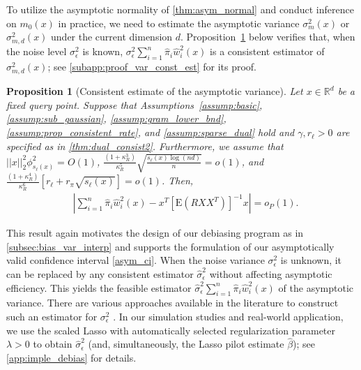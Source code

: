 \documentclass[ejsv2,noshowframe]{imsart}
\theoremstyle{plain}
\newtheorem{proposition}[theorem]{Proposition}
\theoremstyle{definition}
\theoremstyle{remark}
\newcommand{\norm}[1]{\left|\left| #1 \right|\right|}
\renewcommand{\hat}{\widehat}
\begin{document}
To utilize the asymptotic normality of \autoref{thm:asym_normal} and conduct inference on $m_0(x)$ in practice, we need to estimate the asymptotic variance $\sigma_m^2(x)$ or $\sigma_{m,d}^2(x)$ under the current dimension $d$. Proposition~\ref{prop:var_const_est} below verifies that, when the noise level $\sigma_{\epsilon}^2$ is known, $\sigma_{\epsilon}^2 \sum_{i=1}^n \hat{\pi}_i \hat{w}_i^2(x)$ is a consistent estimator of $\sigma_{m,d}^2(x)$; see \autoref{subapp:proof_var_const_est} for its proof. 

\begin{proposition}[Consistent estimate of the asymptotic variance]
	\label{prop:var_const_est}
	Let $x\in \mathbb{R}^d$ be a fixed query point. Suppose that Assumptions~\ref{assump:basic}, \ref{assump:sub_gaussian}, \ref{assump:gram_lower_bnd}, \ref{assump:prop_consistent_rate}, and \ref{assump:sparse_dual} hold and $\gamma, r_{\ell} >0$ are specified as in \autoref{thm:dual_consist2}. Furthermore, we assume that $\norm{x}_2^2 \phi_{s_{\ell}(x)}^2 = O(1)$, $\frac{(1+\kappa_R^3)}{\kappa_R^5} \sqrt{\frac{s_{\ell}(x)\log(nd)}{n}} = o(1)$, and $\frac{(1+\kappa_R^4)}{\kappa_R^6} \left[r_{\ell} + r_{\pi}\sqrt{s_{\ell}(x)}\right]=o(1)$. Then,
	\begin{align*}
		&\left|\sum_{i=1}^n \hat{\pi}_i \hat{w}_i^2(x) - x^T\left[\mathrm{E}\left(RXX^T\right)\right]^{-1}x \right|=o_P(1).
	\end{align*}
\end{proposition}

This result again motivates the design of our debiasing program as in \autoref{subsec:bias_var_interp} and supports the formulation of our asymptotically valid confidence interval \eqref{asym_ci}. When the noise variance $\sigma_{\epsilon}^2$ is unknown, it can be replaced by any consistent estimator $\hat{\sigma}_{\epsilon}^2$ without affecting asymptotic efficiency. This yields the feasible estimator $\hat{\sigma}_{\epsilon}^2 \sum_{i=1}^n \hat{\pi}_i \hat{w}_i^2(x)$ of the asymptotic variance. There are various approaches available in the literature to construct such an estimator for $\sigma_{\epsilon}^2$ \citep{zhang2010mcp,fan2012variance,dicker2012residual,bayati2013estimating,belloni2013least,reid2016study}. In our simulation studies and real-world application, we use the scaled Lasso \citep{sun2012scaled} with automatically selected regularization parameter $\lambda>0$ to obtain $\hat{\sigma}_{\epsilon}^2$ (and, simultaneously, the Lasso pilot estimate $\hat{\beta}$); see \autoref{app:imple_debias} for details.
\end{document}
